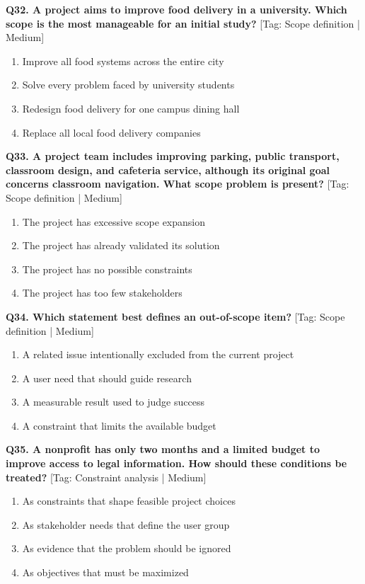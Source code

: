 \noindent\textbf{Q32. A project aims to improve food delivery in a university. Which scope is the most manageable for an initial study?} \hfill [Tag: Scope definition | Medium]
\begin{enumerate}[label=(\alph*),topsep=2pt,itemsep=1pt,partopsep=0pt,parsep=0pt]
    \item {Improve all food systems across the entire city}
    \item {Solve every problem faced by university students}
    \item {Redesign food delivery for one campus dining hall}
    \item {Replace all local food delivery companies}
\end{enumerate}
\vspace{2mm}

\noindent\textbf{Q33. A project team includes improving parking, public transport, classroom design, and cafeteria service, although its original goal concerns classroom navigation. What scope problem is present?} \hfill [Tag: Scope definition | Medium]
\begin{enumerate}[label=(\alph*),topsep=2pt,itemsep=1pt,partopsep=0pt,parsep=0pt]
    \item {The project has excessive scope expansion}
    \item {The project has already validated its solution}
    \item {The project has no possible constraints}
    \item {The project has too few stakeholders}
\end{enumerate}
\vspace{2mm}

\noindent\textbf{Q34. Which statement best defines an out-of-scope item?} \hfill [Tag: Scope definition | Medium]
\begin{enumerate}[label=(\alph*),topsep=2pt,itemsep=1pt,partopsep=0pt,parsep=0pt]
    \item {A related issue intentionally excluded from the current project}
    \item {A user need that should guide research}
    \item {A measurable result used to judge success}
    \item {A constraint that limits the available budget}
\end{enumerate}
\vspace{2mm}

\noindent\textbf{Q35. A nonprofit has only two months and a limited budget to improve access to legal information. How should these conditions be treated?} \hfill [Tag: Constraint analysis | Medium]
\begin{enumerate}[label=(\alph*),topsep=2pt,itemsep=1pt,partopsep=0pt,parsep=0pt]
    \item {As constraints that shape feasible project choices}
    \item {As stakeholder needs that define the user group}
    \item {As evidence that the problem should be ignored}
    \item {As objectives that must be maximized}
\end{enumerate}
\vspace{2mm}

